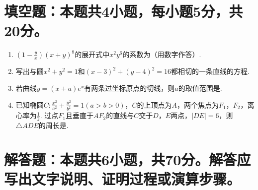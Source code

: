 \documentclass[11pt,space]{ctexart} %
\begin{document}
\section{填空题：本题共4小题，每小题5分，共20分。}
\begin{enumerate}[itemsep=0.3em,topsep=0pt,resume]%

\item  $(1-\frac{y}{x})(x+y)^8$的展开式中$x^2y^6$的系数为\blank{}（用数字作答）.
\item  写出与圆$x^2+y^2=1$和$(x-3)^2+(y-4)^2=16$都相切的一条直线的方程\blank{}.
\item  若曲线$y=(x+a)e^x$有两条过坐标原点的切线，则$a$的取值范围是\blank{}.
\item  已知椭圆$C:\frac{x^2}{a^2}+\frac{y^2}{b^2}=1(a>b>0)$，$C$的上顶点为$A$，两个焦点为$F_1$，$F_2$，离心率为$\frac{1}{2}$. 过点$F_1$且垂直于$AF_2$的直线与$C$交于$D$，$E$两点，$|DE|=6$，则$\triangle ADE$的周长是\blank{}.

\end{enumerate}

\section{解答题：本题共6小题，共70分。解答应写出文字说明、证明过程或演算步骤。}
\end{document}

